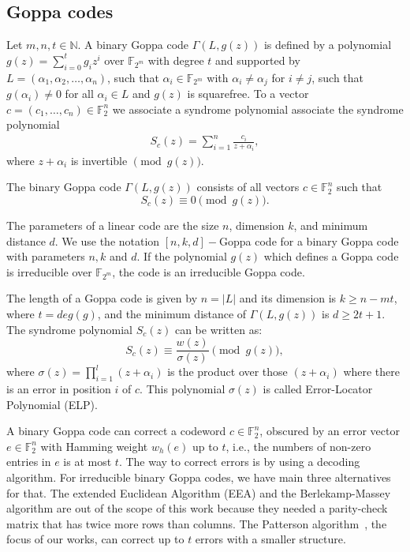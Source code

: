 \subsection{Goppa codes}
Let $m, n, t\in \mathbb{N}$. A binary Goppa code $\Gamma(L, g(z))$ is defined by a polynomial $g(z) = \sum_{i=0}^{t}g_iz^i$ over $\mathbb{F}_{2^m}$ with degree $t$ and supported by $L = (\alpha_1, \alpha_2, \dots, \alpha_n)$, such that $\alpha_i \in \mathbb{F}_{2^m}$ with $\alpha_i \neq \alpha_j$ for $i\neq j$, such that $g(\alpha_i) \neq 0$ for all $\alpha_i \in L$ and $g(z)$ is squarefree. To a vector  $c = (c_1, \ldots, c_{n}) \in \mathbb{F}^n_{2}$ we associate a syndrome polynomial associate the syndrome polynomial
\begin{align}
  S_c(z) = \sum_{i=1}^{n} \frac{c_i}{z+\alpha_i},  
\end{align}
where ${z+\alpha_i}$ is invertible $\pmod{g(z)}$.
\begin{definition}
The binary Goppa code $\Gamma(L, g(z))$ consists of all vectors $c \in \mathbb{F}_{2}^n$ such that
\begin{equation}
    S_c(z) \equiv 0 \pmod{g(z)}.
\end{equation}
\end{definition}

The parameters of a linear code are the size $n$, dimension $k$, and minimum distance $d$. We use the notation $[n,k,d]-$Goppa code for a binary Goppa code with parameters $n,k$ and $d$. If the polynomial $g(z)$ which defines a Goppa code is irreducible over $\mathbb{F}_{2^m}$, the code is an irreducible Goppa code.

The length of a Goppa code is given by $n = |L|$ and its dimension is $k \geq n-mt$, where $t = deg(g)$, and the minimum distance of $\Gamma(L, g(z))$ is $d \geq 2t + 1$. The syndrome polynomial $S_c(z)$ can be written as:
\begin{equation}
    S_c(z) \equiv \frac{w(z)}{\sigma(z)} \pmod{g(z)},
\end{equation}
where $\sigma(z) = {\displaystyle \prod_{i=1}^{l}(z+\alpha_i)}$ is the product over those $(z+\alpha_i)$ where there is an error in position $i$ of $c$. This polynomial $\sigma(z)$ is called Error-Locator Polynomial (ELP).

A binary Goppa code can correct a codeword $c \in \mathbb{F}_{2}^n$, obscured by an error vector $e \in \mathbb{F}_{2}^n$ with Hamming weight $w_h(e)$ up to $t$, i.e., the numbers of non-zero entries in $e$ is at most $t$. The way to correct errors is by using a decoding algorithm. For irreducible binary Goppa codes, we have main three alternatives for that. The extended Euclidean Algorithm (EEA) and the Berlekamp-Massey algorithm are out of the scope of this work because they needed a parity-check matrix that has twice more rows than columns. The Patterson algorithm~\cite{patterson1975algebraic}, the focus of our works, can correct up to $t$ errors with a smaller structure.

